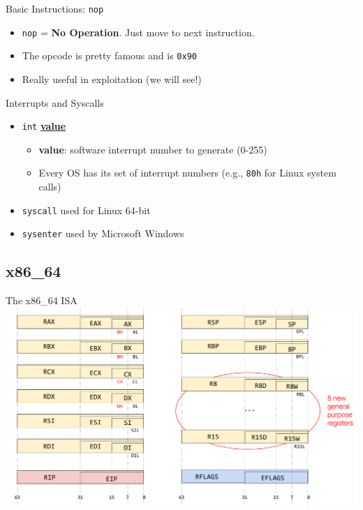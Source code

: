 \documentclass[]{beamer}
\begin{document}
\begin{frame}{Basic Instructions: {\tt nop}}
  \begin{itemize}
  \item{{\tt nop} = \textbf{No Operation}. Just move to next instruction.}
  \item{The opcode is pretty famous and is {\tt 0x90}}
  \item{Really useful in exploitation (we will see!)}
  \end{itemize}
\end{frame}

\begin{frame}{Interrupts and Syscalls}

  \begin{itemize}
  	\item {\tt int} \underline{\textbf{value}}
  		\begin{itemize} 
  			\item \textbf{value}: software interrupt number to generate (0-255)
  			\item Every OS has its set of interrupt numbers (e.g., {\tt 80h} for Linux system calls)
  		\end{itemize}
  	\item {\tt syscall} used for Linux 64-bit
  	\item {\tt sysenter} used by Microsoft Windows
  \end{itemize}
\end{frame}

\subsection{x86\_64}
\begin{frame}{The x86\_64 ISA}
  \centering
  \includegraphics[width=1\linewidth]{images/x86-64}
\end{frame}
\end{document}
